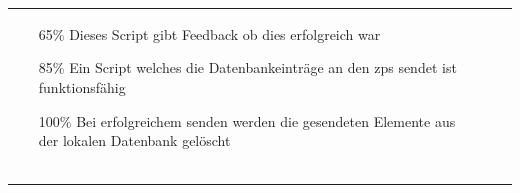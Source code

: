 \begin{scriptsize}
\begin{center}
\begin{tabularx}{\textwidth}{|p{2.2cm}|X|}
{\begin{minipage}{.78\textwidth}
\begin{flushleft}
\begin{itemize}[leftmargin=7mm]
         \item[65\%] Dieses Script gibt Feedback ob dies erfolgreich war
         \item[85\%] Ein Script welches die Datenbankeinträge an den \gls{zps} sendet ist funktionsfähig
         \item[100\%] Bei erfolgreichem senden werden die gesendeten Elemente aus der lokalen Datenbank gelöscht
    \end{itemize}
    \end{flushleft}
    \end{minipage}} \\
    & & & \\
    & & & \\
    & & & \\
    \hline
\end{tabularx}
\end{center}
\endgroup
\end{scriptsize}
\newpage


